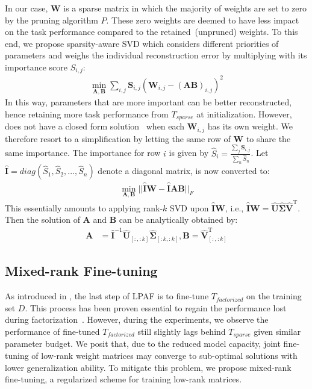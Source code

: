 In our case, $\bm{W}$ is a sparse matrix in which the majority of weights are set to zero by the pruning algorithm $P$. These zero weights are deemed to have less impact on the task performance compared to the retained~(unpruned) weights. 
To this end, we propose sparsity-aware SVD which considers different priorities of parameters and weighs the individual reconstruction error by multiplying with its importance score $S_{i,j}$:
\begin{align}
	\min_{\bm{A},\bm{B}}\sum_{i,j}\bm{S}_{i,j}(\bm{W}_{i,j}-(\bm{AB})_{i,j})^2
	\label{eq:sasvd}
\end{align}
In this way, parameters that are more important can be better reconstructed, hence retaining more task performance from $T_{sparse}$ at initialization. However,  does not have a closed form solution~\cite{weightedsvd,hsu2021language} when each $\bm{W}_{i,j}$ has its own weight. We therefore resort to a simplification by letting the same row of $\bm{W}$ to share the same importance. The importance for row $i$ is given by $\hat{S}_{i}=\frac{\sum_{j}\bm{S}_{i,j}}{\sum_{n}\hat{S}_{n}}$. Let $\hat{\bm{I}}=diag(\hat{S}_1,\hat{S}_2,...,\hat{S}_{n})$ denote a diagonal matrix,   is now converted to:
\begin{align}
	\min_{\bm{A},\bm{B}}||\hat{\bm{I}}\bm{W}-\hat{\bm{I}}\bm{A}\bm{B}||_F
\end{align}
This essentially amounts to applying rank-$k$ SVD upon $\hat{\bm{I}}\bm{W}$, i.e., $\hat{\bm{I}}\bm{W}=\hat{\bm{U}}\hat{\bm{\Sigma}}\hat{\bm{V}}^\mathrm{T}$. Then the solution of $\bm{A}$ and $\bm{B}$ can be analytically obtained by:
\begin{align}
	\bm{A} &= \hat{\bm{I}}^{-1}\hat{\bm{U}}_{[:,:k]}\hat{\bm{\Sigma}}_{[:k,:k]},\bm{B}=\hat{\bm{V}}_{[:,:k]}^{\mathrm{T}}
\end{align}


\subsection{Mixed-rank Fine-tuning}
As introduced in , the last step of LPAF is to fine-tune $T_{factorized}$ on the training set $D$. This process has been proven essential to regain the performance lost during factorization~\cite{svd}. However, during the experiments, we observe the performance of fine-tuned $T_{factorized}$ still slightly lags behind $T_{sparse}$ given similar parameter budget. 
We posit that, due to the reduced model capacity, joint fine-tuning of low-rank weight matrices may converge to sub-optimal solutions with lower generalization ability. To mitigate this problem, we propose mixed-rank fine-tuning, a regularized scheme for training low-rank matrices.

